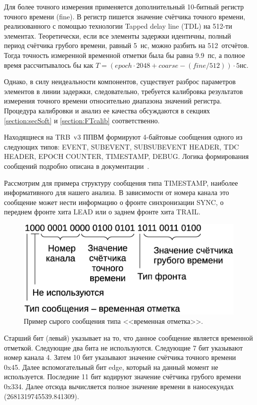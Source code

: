 Для более точного измерения применяется дополнительный 10-битный регистр точного времени (fine). В регистр пишется значение счётчика точного времени, реализованного с помощью технологии Tapped delay line (TDL) на 512-ти элементах. Теоретически, если все элементы задержки идентичны, полный период счётчика грубого времени, равный 5~нс, можно разбить на 512~отсчётов. Тогда точность измеренной временной отметки была бы равна 9.9~пс, а полное время рассчитывалось бы как $ T = (epoch \cdot 2048 + coarse - (fine/512)) \cdot 5 $нс.

Однако, в силу неидеальности компонентов, существует разброс параметров элементов в линии задержки, следовательно, требуется калибровка результатов измерения точного времени относительно диапазона значений регистра. Процедура калибровки и анализ ее качества обсуждаются в секциях \ref{section:secSoft} и \ref{section:FTcalib} соответственно.

Находящиеся на TRB~v3 ППВМ формируют 4-байтовые сообщения одного из следующих типов: EVENT, SUBEVENT, SUBSUBEVENT HEADER, TDC HEADER, EPOCH COUNTER, TIMESTAMP, DEBUG. Логика формирования сообщений подробно описана в документации~\cite{}.

Рассмотрим для примера структуру сообщения типа TIMESTAMP, наиболее информативного для нашего анализа. В зависимости от номера канала это сообщение может нести информацию о фронте синхронизации SYNC, о переднем фронте хита LEAD или о заднем фронте хита TRAIL.

\begin{figure}
\includegraphics[width=1.0\textwidth]{pictures/8_Unpacking.eps}
\caption{Пример сырого сообщения типа <<временная отметка>>.}
\label{fig:Unpacking}
\end{figure}

Старший бит (левый) указывает на то, что данное сообщение является временной отметкой. Следующие два бита не используются. Следующие 7 бит указывают номер канала 4. Затем 10 бит указывают значение счётчика точного времени 0x45. Далее вспомогательный бит edge, который на данный момент не используется. Последние 11 бит кодируют значение счётчика грубого времени 0x334. Далее отсюда вычисляется полное значение времени в наносекундах (2681319745539.841309).

